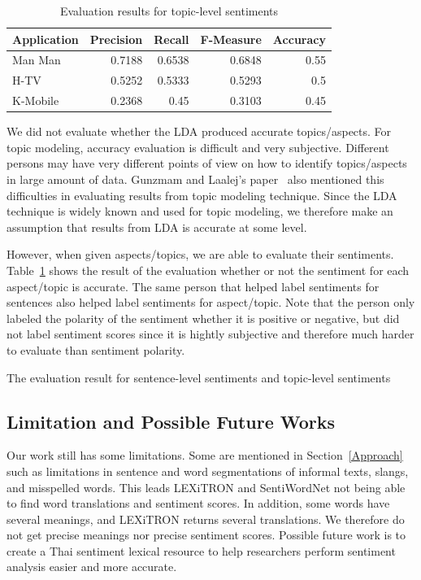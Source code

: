 \begin{table}[h]
	\caption{Evaluation results for topic-level sentiments}
	\label{table:f-measureTopic}
	\centering
	\begin{tabular}{|l|r|r|r|r|}
		\hline
		\multicolumn{1}{|c|}{\textbf{Application}} & 
		\multicolumn{1}{|c|}{\textbf{Precision}} &
		\multicolumn{1}{|c|}{\textbf{Recall}} &
		\multicolumn{1}{|c|}{\textbf{F-Measure}} &
		\multicolumn{1}{|c|}{\textbf{Accuracy}} \\
		\hline
		Man Man & 0.7188 & 0.6538 & 0.6848 & 0.55\\
		\hline
		H-TV & 0.5252 & 0.5333 & 0.5293 & 0.5\\
		\hline
		K-Mobile & 0.2368 & 0.45 & 0.3103 & 0.45\\
		\hline
	\end{tabular}
\end{table}


We did not evaluate whether the LDA produced accurate topics/aspects. For topic modeling, accuracy evaluation is difficult and very subjective. Different persons may have very different points of view on how to identify topics/aspects in large amount of data. Gunzmam and Laalej's paper~\cite{userslikefeature} also mentioned this difficulties in evaluating results from topic modeling technique. Since the LDA technique is widely known and used for topic modeling, we therefore make an assumption that results from LDA is accurate at some level. 

However, when given aspects/topics, we are able to evaluate their sentiments. Table~\ref{table:f-measureTopic} shows the result of the evaluation whether or not the sentiment for each aspect/topic is accurate. The same person that helped label sentiments for sentences also helped label sentiments for aspect/topic. Note that the person only labeled the polarity of the sentiment whether it is positive or negative, but did not label sentiment scores since it is hightly subjective and therefore much harder to evaluate than sentiment polarity.


The evaluation result for sentence-level sentiments and topic-level sentiments 


\subsection*{Limitation and Possible Future Works}
Our work still has some limitations. Some are mentioned in Section~\ref{Approach} such as limitations in sentence and word segmentations of informal texts, slangs, and misspelled words. This leads LEXiTRON and  SentiWordNet not being able to find word translations and sentiment scores. In addition, some words have several meanings, and LEXiTRON returns several translations. We therefore do not get precise meanings nor precise sentiment scores. Possible future work is to create a Thai sentiment lexical resource to help researchers perform sentiment analysis easier and more accurate.

